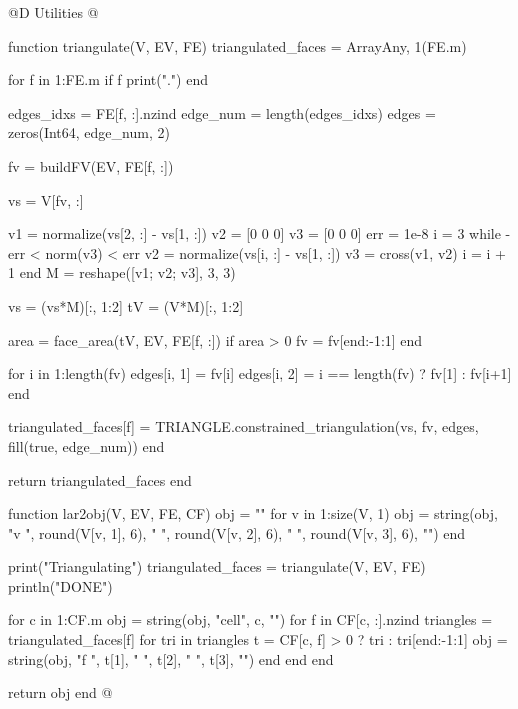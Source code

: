 @D Utilities
@{function triangulate(V, EV, FE)
    triangulated_faces = Array{Any, 1}(FE.m)

    for f in 1:FE.m
        if f %
            print(".")
        end

        edges_idxs = FE[f, :].nzind
        edge_num = length(edges_idxs)
        edges = zeros(Int64, edge_num, 2)

        
        fv = buildFV(EV, FE[f, :])

        vs = V[fv, :]

        v1 = normalize(vs[2, :] - vs[1, :])
        v2 = [0 0 0]
        v3 = [0 0 0]
        err = 1e-8
        i = 3
        while -err < norm(v3) < err
            v2 = normalize(vs[i, :] - vs[1, :])
            v3 = cross(v1, v2)
            i = i + 1
        end
        M = reshape([v1; v2; v3], 3, 3)

        vs = (vs*M)[:, 1:2]
        tV = (V*M)[:, 1:2]

        area = face_area(tV, EV, FE[f, :])
        if area > 0 
            fv = fv[end:-1:1]
        end
        
        for i in 1:length(fv)
            edges[i, 1] = fv[i]
            edges[i, 2] = i == length(fv) ? fv[1] : fv[i+1]
        end
        
        triangulated_faces[f] = TRIANGLE.constrained_triangulation(vs, fv, edges, fill(true, edge_num))
    end

    return triangulated_faces
end

function lar2obj(V, EV, FE, CF)
    obj = ""
    for v in 1:size(V, 1)
        obj = string(obj, "v ", round(V[v, 1], 6), " ", round(V[v, 2], 6), " ", round(V[v, 3], 6), "\n")
    end

    print("Triangulating")
    triangulated_faces = triangulate(V, EV, FE)
    println("DONE")

    for c in 1:CF.m
        obj = string(obj, "\ng cell", c, "\n")
        for f in CF[c, :].nzind
            triangles = triangulated_faces[f]
            for tri in triangles
                t = CF[c, f] > 0 ? tri : tri[end:-1:1]
                obj = string(obj, "f ", t[1], " ", t[2], " ", t[3], "\n")
            end
        end
    end

    return obj
end
@}